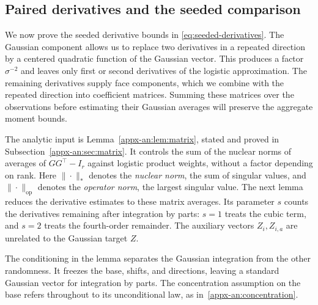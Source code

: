 \documentclass[11pt,letterpaper]{article}
\theoremstyle{remark}
\newcommand{\op}{\mathrm{op}}
\begin{document}
\subsection{Paired derivatives and the seeded comparison}
\label{appx-an:sec:restoration}

We now prove the seeded derivative bounds in
\eqref{eq:seeded-derivatives}. The Gaussian component allows us to
replace two derivatives in a repeated direction by a centered
quadratic function of the Gaussian vector. This produces a factor
$\sigma^{-2}$ and leaves only first or second derivatives of the
logistic approximation. The remaining derivatives supply face
components, which we combine with the repeated direction into
coefficient matrices. Summing these matrices over the observations
before estimating their Gaussian averages will preserve the
aggregate moment bounds.

The analytic input is Lemma~\ref{appx-an:lem:matrix}, stated and
proved in Subsection~\ref{appx-an:sec:matrix}. It controls the sum of
the nuclear norms of averages of $GG^\top-I_r$ against
logistic product weights, without a factor depending on rank.
Here $\|\cdot\|_*$ denotes the \emph{nuclear norm}, the sum of
singular values, and $\|\cdot\|_{\op}$ denotes the
\emph{operator norm}, the largest singular value. The next lemma
reduces the derivative estimates to these matrix averages. Its
parameter $s$ counts the derivatives remaining after integration
by parts: $s=1$ treats the cubic term, and $s=2$ treats the
fourth-order remainder. The auxiliary vectors $Z_i,Z_{i,a}$ are
unrelated to the Gaussian target $Z$.

The conditioning in the lemma separates the Gaussian integration
from the other randomness. It freezes the base, shifts, and
directions, leaving a standard Gaussian vector for integration by
parts. The concentration assumption on the base refers throughout
to its unconditional law, as in~\eqref{appx-an:concentration}.
\end{document}

